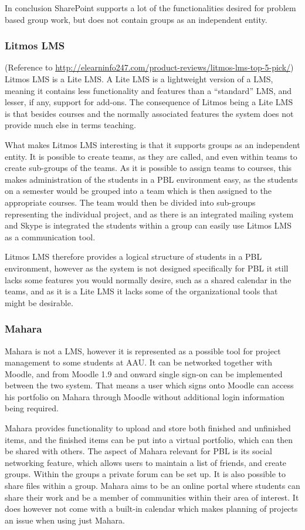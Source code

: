 \documentclass[a4paper,10pt]{article}
\begin{document}
In conclusion SharePoint supports a lot of the functionalities desired for problem based group work, but does not contain groups as an independent entity.

\subsubsection{Litmos LMS} (Reference to \url{http://elearninfo247.com/product-reviews/litmos-lms-top-5-pick/})
Litmos LMS is a Lite LMS.
A Lite LMS is a lightweight version of a LMS, meaning it contains less functionality and features than a ``standard'' LMS, and lesser, if any, support for add-ons.
The consequence of Litmos being a Lite LMS is that besides courses and the normally associated features the system does not provide much else in terms teaching.

What makes Litmos LMS interesting is that it supports groups as an independent entity.
It is possible to create teams, as they are called, and even within teams to create sub-groups of the teams.
As it is possible to assign teams to courses, this makes administration of the students in a PBL environment easy, as the students on a semester would be grouped into a team which is then assigned to the appropriate courses.
The team would then be divided into sub-groups representing the individual project, and as there is an integrated mailing system and Skype is integrated the students within a group can easily use Litmos LMS as a communication tool. 

Litmos LMS therefore provides a logical structure of students in a PBL environment, however as the system is not designed specifically for PBL it still lacks some features you would normally desire, such as a shared calendar in the teams, and as it is a Lite LMS it lacks some of the organizational tools that might be desirable.

\subsubsection{Mahara}
Mahara is not a LMS, however it is represented as a possible tool for project management to some students at AAU.
It can be networked together with Moodle, and from Moodle 1.9 and onward single sign-on can be implemented between the two system.
That means a user which signs onto Moodle can access his portfolio on Mahara through Moodle without additional login information being required.

Mahara provides functionality to upload and store both finished and unfinished items, and the finished items can be put into a virtual portfolio, which can then be shared with others.
The aspect of Mahara relevant for PBL is its social networking feature, which allows users to maintain a list of friends, and create groups.
Within the groups a private forum can be set up. It is also possible to share files within a group.
Mahara aims to be an online portal where students can share their work and be a member of communities within their area of interest.
It does however not come with a built-in calendar which makes planning of projects an issue when using just Mahara.
\end{document}

